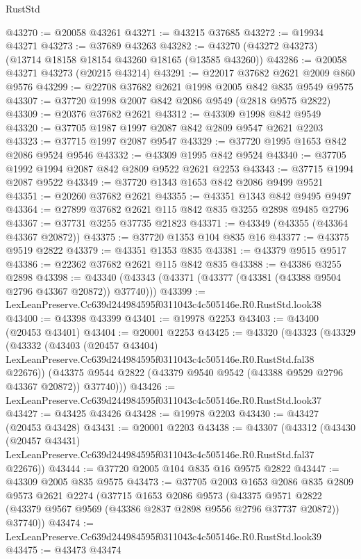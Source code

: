 \begin{lexlean}{RustStd}
\begin{coremodule}
@43270 := @20058 @43261
@43271 := @43215 @37685
@43272 := @19934 @43271
@43273 := @37689 @43263
@43282 := @43270 (@43272 @43273) (@13714 @18158 @18154 @43260 @18165 (@13585 @43260))
@43286 := @20058 @43271 @43273 (@20215 @43214)
@43291 := @22017 @37682 @2621 @2009 @860 @9576
@43299 := @22708 @37682 @2621 @1998 @2005 @842 @835 @9549 @9575
@43307 := @37720 @1998 @2007 @842 @2086 @9549 (@2818 @9575 @2822)
@43309 := @20376 @37682 @2621
@43312 := @43309 @1998 @842 @9549
@43320 := @37705 @1987 @1997 @2087 @842 @2809 @9547 @2621 @2203
@43323 := @37715 @1997 @2087 @9547
@43329 := @37720 @1995 @1653 @842 @2086 @9524 @9546
@43332 := @43309 @1995 @842 @9524
@43340 := @37705 @1992 @1994 @2087 @842 @2809 @9522 @2621 @2253
@43343 := @37715 @1994 @2087 @9522
@43349 := @37720 @1343 @1653 @842 @2086 @9499 @9521
@43351 := @20260 @37682 @2621
@43355 := @43351 @1343 @842 @9495 @9497
@43364 := @27899 @37682 @2621 @115 @842 @835 @3255 @2898 @9485 @2796
@43367 := @37731 @3255 @37735 @21823
@43371 := @43349 (@43355 (@43364 @43367 @20872))
@43375 := @37720 @1353 @104 @835 @16
@43377 := @43375 @9519 @2822
@43379 := @43351 @1353 @835
@43381 := @43379 @9515 @9517
@43386 := @22362 @37682 @2621 @115 @842 @835
@43388 := @43386 @3255 @2898
@43398 := @43340 (@43343 (@43371 (@43377 (@43381 (@43388 @9504 @2796 @43367 @20872)) @37740)))
@43399 := LexLeanPreserve.Cc639d244984595f0311043c4c505146e.R0.RustStd.look38
@43400 := @43398 @43399
@43401 := @19978 @2253
@43403 := @43400 (@20453 @43401)
@43404 := @20001 @2253
@43425 := @43320
    (@43323
      (@43329
        (@43332
          (@43403
            (@20457 @43404)
            LexLeanPreserve.Cc639d244984595f0311043c4c505146e.R0.RustStd.fal38
            @22676))
        (@43375 @9544 @2822 (@43379 @9540 @9542 (@43388 @9529 @2796 @43367 @20872)) @37740)))
@43426 := LexLeanPreserve.Cc639d244984595f0311043c4c505146e.R0.RustStd.look37
@43427 := @43425 @43426
@43428 := @19978 @2203
@43430 := @43427 (@20453 @43428)
@43431 := @20001 @2203
@43438 := @43307
    (@43312
      (@43430
        (@20457 @43431)
        LexLeanPreserve.Cc639d244984595f0311043c4c505146e.R0.RustStd.fal37
        @22676))
@43444 := @37720 @2005 @104 @835 @16 @9575 @2822
@43447 := @43309 @2005 @835 @9575
@43473 := @37705
    @2003
    @1653
    @2086
    @835
    @2809
    @9573
    @2621
    @2274
    (@37715
      @1653
      @2086
      @9573
      (@43375
        @9571
        @2822
        (@43379 @9567 @9569 (@43386 @2837 @2898 @9556 @2796 @37737 @20872))
        @37740))
@43474 := LexLeanPreserve.Cc639d244984595f0311043c4c505146e.R0.RustStd.look39
@43475 := @43473 @43474

\end{coremodule}
\end{lexlean}
